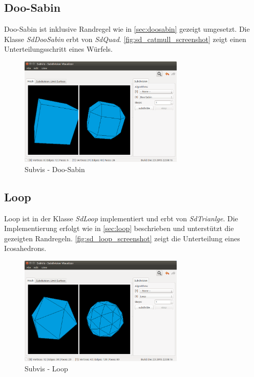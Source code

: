 \subsection{Doo-Sabin}

Doo-Sabin ist inklusive Randregel wie in \autoref{sec:doosabin}
gezeigt umgesetzt. Die Klasse \emph{SdDooSabin} erbt von \emph{SdQuad}.
\autoref{fig:sd_catmull_screenshot} zeigt einen Unterteilungsschritt eines Würfels.

\begin{figure}
  \centering
  \includegraphics[width=0.7\textwidth]{content/media/sd_doosabin_screenshot.png}
  \caption{Subvis - Doo-Sabin}
  \label{fig:sd_doosabin_screenshot}
\end{figure}

\subsection{Loop}

Loop ist in der Klasse \emph{SdLoop} implementiert und erbt von \emph{SdTrianlge}.
Die Implementierung erfolgt wie in \autoref{sec:loop} beschrieben
und unterstützt die gezeigten Randregeln.
\autoref{fig:sd_loop_screenshot} zeigt die Unterteilung eines Icosahedrons.

\begin{figure}
  \centering
  \includegraphics[width=0.7\textwidth]{content/media/sd_loop_screenshot.png}
  \caption{Subvis - Loop}
  \label{fig:sd_loop_screenshot}
\end{figure}

